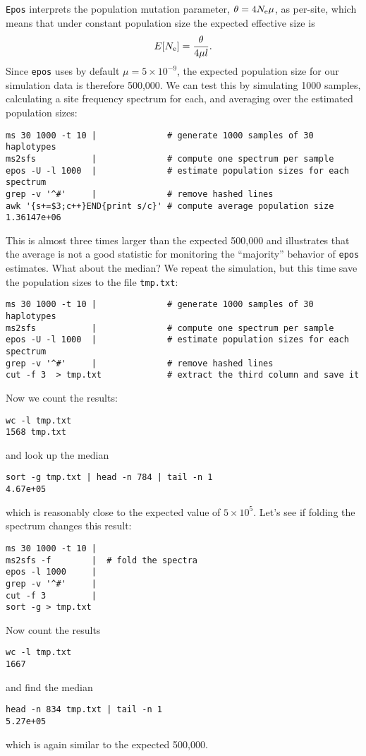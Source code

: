 \documentclass[a4paper, english]{article}
\newcommand{\ty}{\texttt}
\begin{document}
\begin{itemize}
\ty{Epos} interprets the population mutation parameter,
$\theta=4N_{\rm e}\mu$, as per-site, which means that under constant
population size the expected effective size is
\[
E[N_{\rm e}]=\frac{\theta}{4\mu l}.
\]
Since \ty{epos} uses by default $\mu=5\times 10^{-9}$, the expected
population size for our simulation data is therefore 500,000. We can
test this by simulating 1000 samples, calculating a site frequency
spectrum for each, and averaging over the estimated population sizes:
\begin{verbatim}
ms 30 1000 -t 10 |              # generate 1000 samples of 30 haplotypes
ms2sfs           |              # compute one spectrum per sample
epos -U -l 1000  |              # estimate population sizes for each spectrum
grep -v '^#'     |              # remove hashed lines
awk '{s+=$3;c++}END{print s/c}' # compute average population size
1.36147e+06
\end{verbatim}
This is almost three times larger than the expected 500,000 and
illustrates that the average is not a good statistic for monitoring
the ``majority'' behavior of \ty{epos} estimates. What about the
median? We repeat the simulation, but this time save the population sizes to
the file \ty{tmp.txt}:
\begin{verbatim}
ms 30 1000 -t 10 |              # generate 1000 samples of 30 haplotypes
ms2sfs           |              # compute one spectrum per sample
epos -U -l 1000  |              # estimate population sizes for each spectrum
grep -v '^#'     |              # remove hashed lines
cut -f 3  > tmp.txt             # extract the third column and save it
\end{verbatim}
Now we count the results:
\begin{verbatim}
wc -l tmp.txt
1568 tmp.txt
\end{verbatim}
and look up the median
\begin{verbatim}
sort -g tmp.txt | head -n 784 | tail -n 1
4.67e+05
\end{verbatim}
which is reasonably close to the expected value of $5\times 10^5$.
Let's see if folding the
spectrum changes this result:
\begin{verbatim}
ms 30 1000 -t 10 | 
ms2sfs -f        |  # fold the spectra 
epos -l 1000     |  
grep -v '^#'     |
cut -f 3         |
sort -g > tmp.txt
\end{verbatim}
Now count the results
\begin{verbatim}
wc -l tmp.txt
1667
\end{verbatim}
and find the median
\begin{verbatim}
head -n 834 tmp.txt | tail -n 1
5.27e+05
\end{verbatim}
which is again similar to the expected 500,000. 
\end{itemize}
\end{document}
